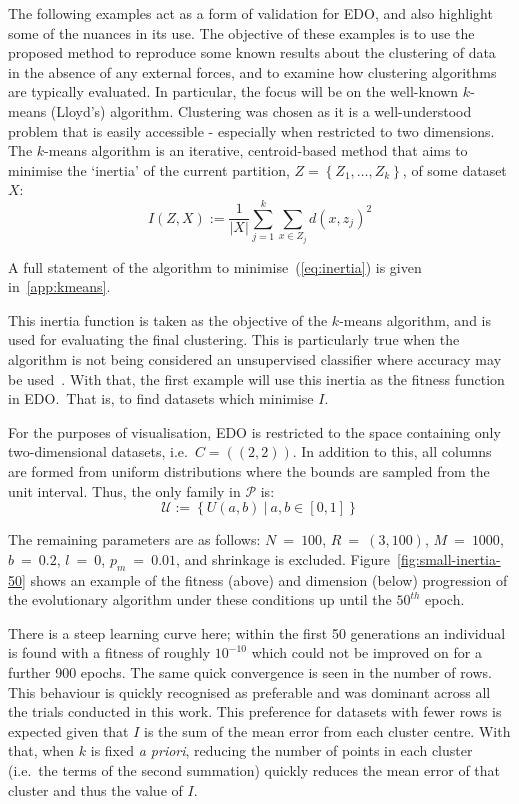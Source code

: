 \documentclass[11pt]{article}
\begin{document}
The following examples act as a form of validation for EDO, and also highlight
some of the nuances in its use. The objective of these examples is to use the
proposed method to reproduce some known results about the clustering of data in
the absence of any external forces, and to examine how clustering algorithms are
typically evaluated. In particular, the focus will be on the well-known
\(k\)-means (Lloyd's) algorithm. Clustering was chosen as it is a
well-understood problem that is easily accessible \-- especially when restricted
to two dimensions. The \(k\)-means algorithm is an iterative, centroid-based
method that aims to minimise the `inertia' of the current partition, \(Z =
\left\{Z_1, \ldots, Z_k\right\}\), of some dataset \(X\):
\begin{equation}
    I(Z, X) := \frac{1}{|X|} \sum_{j=1}^{k} \sum_{x \in Z_j} {d(x, z_j)}^2
    \label{eq:inertia}
\end{equation}

A full statement of the algorithm to minimise~(\ref{eq:inertia}) is given
in~\ref{app:kmeans}. 

This inertia function is taken as the objective of the \(k\)-means algorithm,
and is used for evaluating the final clustering. This is particularly true when
the algorithm is not being considered an unsupervised classifier where accuracy
may be used~\cite{Huang1998}. With that, the first example will use this inertia
as the fitness function in EDO.\ That is, to find datasets which minimise \(I\).

For the purposes of visualisation, EDO is restricted to the space containing
only two-dimensional datasets, i.e.\ \(C = \left((2, 2)\right)\). In addition to
this, all columns are formed from uniform distributions where the bounds are
sampled from the unit interval. Thus, the only family in \(\mathcal{P}\) is:
\begin{equation}
    \mathcal{U} := \left\{U(a, b)~|~a, b \in [0, 1]\right\}
\end{equation}

The remaining parameters are as follows: \(N~=~100\), \(R~=~(3, 100)\),
\(M~=~1000\), \(b~=~0.2\), \(l~=~0\), \(p_m~=~0.01\), and shrinkage is excluded.
Figure~\ref{fig:small-inertia-50} shows an example of the fitness (above) and
dimension (below) progression of the evolutionary algorithm under these
conditions up until the \(50^{th}\) epoch.

There is a steep learning curve here; within the first 50 generations an
individual is found with a fitness of roughly \(10^{-10}\) which could not be
improved on for a further 900 epochs. The same quick convergence is seen in the
number of rows. This behaviour is quickly recognised as preferable and was
dominant across all the trials conducted in this work. This preference for
datasets with fewer rows is expected given that \(I\) is the sum of the mean
error from each cluster centre. With that, when \(k\) is fixed \textit{a
priori}, reducing the number of points in each cluster (i.e.\ the terms of the
second summation) quickly reduces the mean error of that cluster and thus the
value of \(I\).
\end{document}

